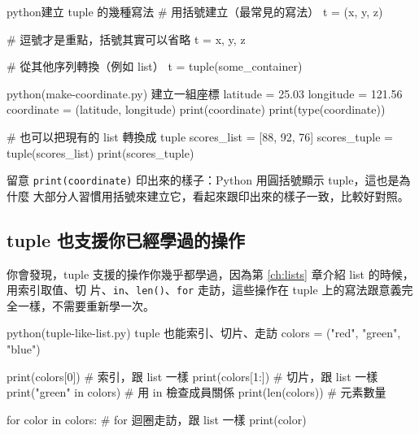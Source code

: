 \begin{code}{python}{建立 tuple 的幾種寫法}
# 用括號建立（最常見的寫法）
t = (x, y, z)

# 逗號才是重點，括號其實可以省略
t = x, y, z

# 從其他序列轉換（例如 list）
t = tuple(some_container)
\end{code}

\begin{example}{python}{(make-coordinate.py) 建立一組座標}
latitude = 25.03
longitude = 121.56
coordinate = (latitude, longitude)
print(coordinate)
print(type(coordinate))

# 也可以把現有的 list 轉換成 tuple
scores_list = [88, 92, 76]
scores_tuple = tuple(scores_list)
print(scores_tuple)
\end{example}


留意 \texttt{print(coordinate)} 印出來的樣子：Python 用圓括號顯示 tuple，這也是為什麼
大部分人習慣用括號來建立它，看起來跟印出來的樣子一致，比較好對照。

\subsection*{tuple 也支援你已經學過的操作}

你會發現，tuple 支援的操作你幾乎都學過，因為第 \ref{ch:lists} 章介紹 list 的時候，用索引取值、切
片、\texttt{in}、\texttt{len()}、\texttt{for} 走訪，這些操作在 tuple 上的寫法跟意義完
全一樣，不需要重新學一次。

\begin{example}{python}{(tuple-like-list.py) tuple 也能索引、切片、走訪}
colors = ("red", "green", "blue")

print(colors[0])          # 索引，跟 list 一樣
print(colors[1:])         # 切片，跟 list 一樣
print("green" in colors)  # 用 in 檢查成員關係
print(len(colors))        # 元素數量

for color in colors:      # for 迴圈走訪，跟 list 一樣
    print(color)
\end{example}


